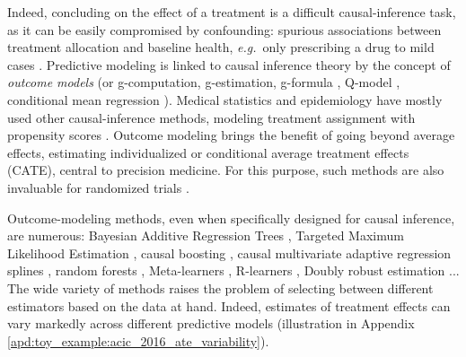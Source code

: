 \documentclass[a4paper,num-refs]{oup-contemporary}%
\newcommand{\eg}{\emph{e.g.}}
\begin{document}

Indeed, concluding on the effect of a treatment is a difficult
causal-inference task, as it can be easily compromised by confounding:
spurious associations between treatment
allocation and baseline health, \eg~only prescribing a drug to mild cases
\cite{hernan_causal_2020,vanderweele2019principles}.
Predictive modeling is linked to causal inference theory by the concept of
\emph{outcome models} (or g-computation, g-estimation,
g-formula \cite{robins_role_1986}, Q-model
\cite{snowden_implementation_2011}, conditional mean regression
\cite{wendling_comparing_2018}).
Medical statistics and epidemiology have mostly used other
causal-inference methods, modeling treatment assignment
with propensity scores \cite{rosenbaum_central_1983,austin_moving_2015,casucci2018estimating,grose_use_2020}. Outcome modeling brings
the benefit of going
beyond average effects, estimating individualized or conditional average
treatment effects (CATE), central to precision medicine.
%
For this purpose, such methods are also invaluable for randomized trials
\cite{su2018random,lamont2018identification,hoogland2021tutorial}.


Outcome-modeling methods, even when specifically designed for causal
inference, are numerous: Bayesian Additive Regression Trees
\cite{hill_bayesian_2011}, Targeted Maximum Likelihood Estimation
\cite{laan_targeted_2011,schuler_targeted_2017}, causal boosting
\cite{powers_methods_2018}, causal multivariate adaptive regression
splines \cite{powers_methods_2018}, random forests
\cite{wager_estimation_2018, athey_generalized_2019},
Meta-learners \cite{kunzel_metalearners_2019}, R-learners
\cite{nie_quasioracle_2017}, Doubly robust estimation
\cite{chernozhukov_double_2018}...
The wide variety of methods raises the problem
of selecting between different estimators based on the data at hand. %
%
Indeed, estimates of treatment effects can vary markedly across different
predictive models \cite{fang2019applying,dorie_automated_2019,leborgne2021g,ren2023comparing} (illustration in
Appendix \ref{apd:toy_example:acic_2016_ate_variability}).
\end{document}
